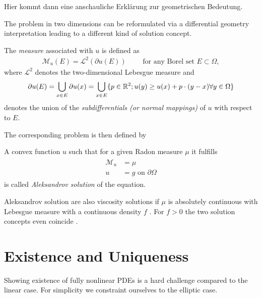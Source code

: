 Hier kommt dann eine anschauliche Erklärung zur geometrischen Bedeutung.

The \MA problem in two dimensions can be reformulated via a differential geometry interpretation leading to a different kind of solution concept.

\begin{definition}\label{def:MA measure}
	The \emph{\MA measure} associated with $u$ is defined as 
	\begin{align}
		\mathcal{M}_u (E) = \mathcal{L}^2(\partial u(E)) \qquad \text{ for any Borel set } E \subset \Omega,
	\end{align}
	where $\mathcal{L}^2$ denotes the two-dimensional Lebesgue measure and 
	\[
		\partial u(E) = \bigcup_{x \in E} \partial u (x) = \bigcup_{x \in E} \{p \in \mathbb{R}^2; u(y) \geq u(x) +p\cdot (y-x) \forall y \in \Omega\}
	\]
	denotes the union of the \emph{subdifferentials (or normal mappings)} of $u$ with respect to $E$.
\end{definition}
The corresponding \MA problem is then defined by

\begin{definition}\label{def:aleksandrov solution}
A convex function $u$ such that for a given Radon measure $\mu$ it fulfills
\begin{align}
\begin{split}
\mathcal M_u&= \mu \\ 
u &= g  \text{ on } \partial \Omega
\end{split}
\end{align}
is called \emph{Aleksandrov solution} of the \MA equation.
\end{definition}

Aleksandrov solution are also viscosity solutions if $\mu$ is absolutely continuous with Lebesgue measure with a continuous density $f$ \cite{G2001} . For $f > 0$ the two solution concepts even coincide \cite{G2001}. 

\section{Existence and Uniqueness}
Showing existence of fully nonlinear PDEs is a hard challenge compared to the linear case. For simplicity we constraint ourselves to the elliptic case. 

